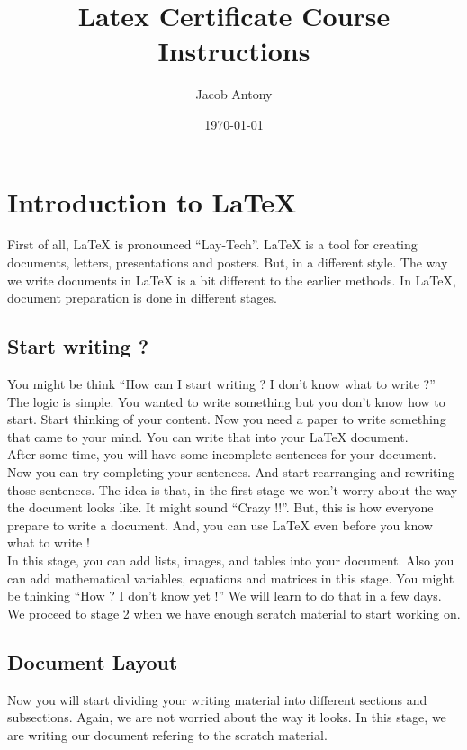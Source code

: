 \documentclass{article}
\title{Latex Certificate Course Instructions}
\author{Jacob Antony}
\date{\today}
\begin{document}
\maketitle

\section{Introduction to LaTeX}
	First of all, LaTeX is pronounced ``Lay-Tech''.
	LaTeX is a tool for creating documents, letters, presentations and posters.
	But, in a different style.
	The way we write documents in LaTeX is a bit different to the earlier methods.
	In LaTeX, document preparation is done in different stages.
\subsection{Start writing ?}
	You might be think ``How can I start writing ? I don't know what to write ?''
	The logic is simple.
	You wanted to write something but you don't know how to start.
	Start thinking of your content. 
	Now you need a paper to write something that came to your mind.
	You can write that into your LaTeX document.\\
	
	After some time, you will have some incomplete sentences for your document.
	Now you can try completing your sentences.
	And start rearranging and rewriting those sentences.
	The idea is that, in the first stage we won't worry about the way the document looks like.
	It might sound ``Crazy !!''.
	But, this is how everyone prepare to write a document.
	And, you can use LaTeX even before you know what to write !\\

	In this stage, you can add lists, images, and tables into your document.
	Also you can add mathematical variables, equations and matrices in this stage.
	You might be thinking ``How ? I don't know yet !''
	We will learn to do that in a few days.
	We proceed to stage 2 when we have enough scratch material to start working on.
\subsection{Document Layout}
	Now you will start dividing your writing material into different sections and subsections.
	Again, we are not worried about the way it looks.
	In this stage, we are writing our document refering to the scratch material.\\
\end{document}
